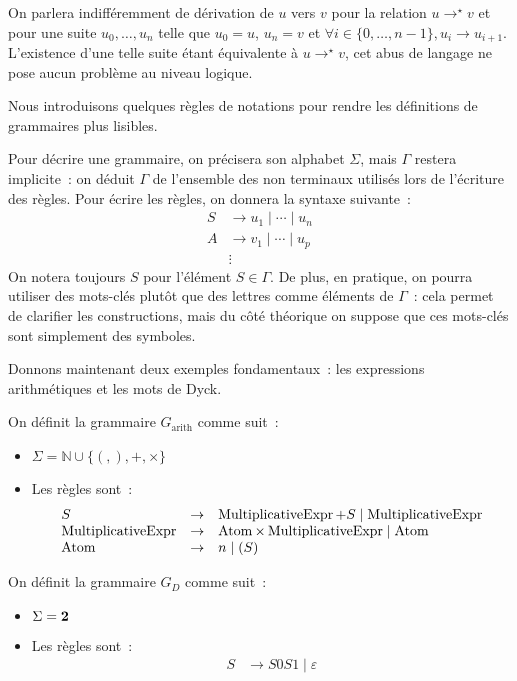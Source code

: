 \begin{remark}
  On parlera indifféremment de dérivation de $u$ vers $v$ pour la relation
  $u \to^\star v$ et pour une suite $u_0,\ldots,u_n$ telle que $u_0 = u$,
  $u_n = v$ et $\forall i \in \{0,\ldots,n-1\},u_i \to u_{i+1}$. L'existence
  d'une telle suite étant équivalente à $u \to^\star v$, cet abus de langage ne
  pose aucun problème au niveau logique.
\end{remark}

Nous introduisons quelques règles de notations pour rendre les définitions de
grammaires plus lisibles.

\begin{notation}
  Pour décrire une grammaire, on précisera son alphabet $\Sigma$, mais $\Gamma$
  restera implicite~: on déduit $\Gamma$ de l'ensemble des non terminaux
  utilisés lors de l'écriture des règles. Pour écrire les règles, on donnera la
  syntaxe suivante~:
  \begin{align*}
    S &\to u_1\mid \cdots\mid u_n\\
    A &\to v_1\mid\cdots\mid u_p\\
    &\vdots
  \end{align*}
  On notera toujours $S$ pour l'élément $S \in \Gamma$. De plus, en pratique, on
  pourra utiliser des mots-clés plutôt que des lettres comme éléments de
  $\Gamma$~: cela permet de clarifier les constructions, mais du côté théorique
  on suppose que ces mots-clés sont simplement des symboles.
\end{notation}

Donnons maintenant deux exemples fondamentaux~: les expressions arithmétiques et
les mots de Dyck.

\begin{example}
  On définit la grammaire $G_{\mathrm{arith}}$ comme suit~:
  \begin{itemize}
  \item $\Sigma = \mathbb N \cup \{(,),+,\times\}$
  \item Les règles sont~:
    \[\begin{array}{lcl}
      S & \to & \operatorname{MultiplicativeExpr} + S \mid \operatorname{MultiplicativeExpr}\\
      \operatorname{MultiplicativeExpr} & \to & \operatorname{Atom} \times \operatorname{MultiplicativeExpr} \mid \operatorname{Atom}\\
      \operatorname{Atom} & \to & n \mid (S)
    \end{array}\]
  \end{itemize}
  
  On définit la grammaire $G_D$ comme suit~:
  \begin{itemize}
  \item $\Sigma = \boldsymbol{2}$
  \item Les règles sont~:
    \begin{align*}
      S &\to S0S1\mid\varepsilon
    \end{align*}
  \end{itemize}
\end{example}

